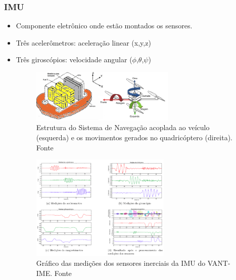 \documentclass{beamer}
\begin{document}
\begin{frame}[allowframebreaks]
	\frametitle{IMU}
	
	\begin{itemize}
		
		\item Componente eletrônico onde estão montados os sensores. 
		
		\item Três acelerômetros: aceleração linear (x,y,z)
		
		\item Três giroscópios: velocidade angular ($\phi$,$\theta$,$\psi$)
	
	    \vspace{0.5cm}
	
		\begin{figure}[h]
			\centering
			\includegraphics[keepaspectratio = true,
			width=0.65\textwidth]{img/imuStrap.png}
			\caption{Estrutura do Sistema de Navegação acoplada ao veículo (esquerda) e os movimentos gerados no quadricóptero (direita). Fonte \cite{Adalberto2009}}
			\label{fig:imuStrap}
		\end{figure}
		
	\framebreak
	
		\begin{figure}
			\centering
			\includegraphics[keepaspectratio = true,
			width=0.63\textwidth]{img/imu_VANTIME.png}
			\caption{Gráfico das medições dos sensores inerciais da IMU do VANT-IME. Fonte \cite{Paixao2011}}
			\label{fig:imuVANTIME}
		\end{figure}
	
	\end{itemize}
\end{frame}	
\end{document}
